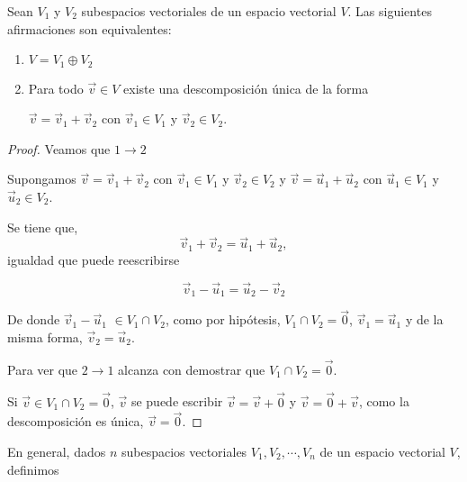 \begin{theorem}
\label{2132}
Sean  $V_1$ y $V_2$  subespacios vectoriales de un espacio vectorial $V$. Las siguientes afirmaciones son equivalentes:

\begin{enumerate}

\item 

$V=V_1  \oplus V_2$

\item 
Para todo $\vec{v}\in V$  existe una descomposición  única de la forma 

$\vec{v}=\vec{v}_1+\vec{v}_2$ con $\vec{v}_1 \in V_1$ y $\vec{v}_2 \in V_2$.  

  
\end{enumerate}

\begin{proof} 
Veamos que $1 \rightarrow  2$

Supongamos $\vec{v}=\vec{v}_1+\vec{v}_2$ con $\vec{v}_1 \in V_1$ y $\vec{v}_2 \in V_2$  y $\vec{v}=\vec{u}_1+\vec{u}_2$ con $\vec{u}_1 \in V_1$ y $\vec{u}_2 \in V_2$. 

\bigskip
Se tiene que, 
$$\vec{v}_1+\vec{v}_2  = \vec{u}_1+\vec{u}_2, $$
\noindent
igualdad que puede reescribirse

$$\vec{v}_1-\vec{u}_1  = \vec{u}_2-\vec{v}_2 $$

De donde $\vec{v}_1-\vec{u}_1$ $\in  V_1 \cap V_2 $, como por hipótesis,      $V_1 \cap V_2={\vec{0}}$, $\vec{v}_1=\vec{u}_1 $ y de la misma forma, $\vec{v}_2=\vec{u}_2 $.

\noindent
Para ver que  $2 \rightarrow  1$ alcanza con demostrar que $V_1 \cap V_2={\vec{0}}$.

Si $ \vec{v} \in  V_1 \cap V_2={\vec{0}}$, $ \vec{v} $ se puede escribir $ \vec{v}=\vec{v}+  \vec{0}  $ y $ \vec{v}=\vec{0}+  \vec{v}  $,
\noindent
como la descomposición es única, $ \vec{v}= \vec{0} $.

\end{proof}
\end{theorem}


\bigskip






En general, dados $n$ subespacios vectoriales $V_1, V_2, \cdots, V_n$ de un espacio vectorial $V$, definimos

